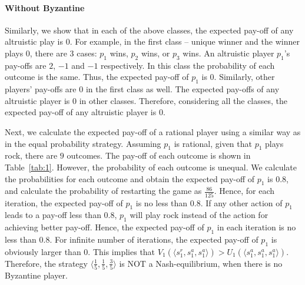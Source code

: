 \paragraph{Without Byzantine}
Similarly, we show that in each of the above classes, the expected pay-off of any altruistic play is $0$. For example, in the first class -- unique winner and the winner plays $0$, there are $3$ cases: $p_1$ wins, $p_2$ wins, or $p_3$ wins. An altruistic player $p_1$'s pay-offs are $2$, $-1$ and $-1$ respectively. In this class the probability of each outcome is the same. Thus, the expected pay-off of $p_1$ is $0$. Similarly, other players' pay-offs are $0$ in the first class as well. The expected pay-offs of any altruistic player is $0$ in other classes. Therefore,  considering all the classes, the expected pay-off of any altruistic player is $0$. %

Next, we calculate the expected pay-off of a rational player using a similar way as in the equal probability strategy. 
Assuming $p_1$ is rational, given that $p_1$ plays rock, there are $9$ outcomes. The pay-off of each outcome is shown in Table~\ref{tab:1}. However, the probability of each outcome is unequal. We calculate the probabilities for each outcome and obtain the expected pay-off of $p_1$ is $0.8$, and calculate the probability of restarting the game as $\frac{86}{125}$. Hence, for each iteration, the expected pay-off of $p_1$ is no less than $0.8$. If any other action of $p_1$ leads to a pay-off less than $0.8$, $p_1$ will play rock instead of the action for achieving better pay-off. Hence, the expected pay-off of $p_1$ in each iteration is no less than $0.8$. For infinite number of iterations, the expected pay-off 
of $p_1$ is obviously larger than $0$. This implies that $V_1(\langle s_1^r,s_1^a,s_1^a  \rangle ) > U_1(\langle s_1^a,s_1^a,s_1^a  \rangle )$. Therefore, the strategy $\langle \frac{1}{5},\frac{1}{5},\frac{3}{5} \rangle$ is NOT a Nash-equilibrium, when there is no Byzantine player.

